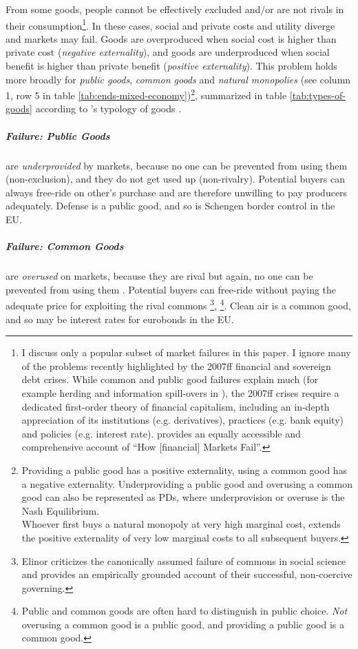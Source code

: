 From some goods, people cannot be effectively excluded and/or are not rivals in their consumption\footnote{
	I discuss only a popular subset of market failures in this paper. I ignore many of the problems recently highlighted by the 2007ff financial and sovereign debt crises. While common and public good failures explain much (for example herding and information spill-overs in \citealt{Banerjee-1992-aa}), the 2007ff crises require a dedicated first-order theory of financial capitalism, including an in-depth appreciation of its institutions (e.g. derivatives), practices (e.g. bank equity) and policies (e.g. interest rate). \cite{Cassidy2010} provides an equally accessible and comprehensive account of ``How [financial] Markets Fail''.}. %
In these cases, social and private costs and utility diverge and markets may fail. Goods are overproduced when social cost is higher than private cost (\emph{negative externality}), and goods are underproduced when social benefit is higher than private benefit (\emph{positive externality}). This problem holds more broadly for \emph{public goods}, \emph{common goods} and \emph{natural monopolies} (see column 1, row 5 in table \ref{tab:ends-mixed-economy})\footnote{
	Providing a public good has a positive externality, using a common good has a negative externality. Underproviding a public good and overusing a common good can also be represented as \glspl{PD}, where underprovision or overuse is the Nash Equilibrium. \\ Whoever first buys a natural monopoly at very high marginal cost, extends the positive externality of very low marginal costs to all subsequent buyers.}, 
summarized in table \ref{tab:types-of-goods} according to \citeauthor{Samuelson-1954-eu}'s typology of goods \citeyearpar{Samuelson-1954-eu}. 



\subparagraph{Failure: Public Goods}  \label{sec:public-good} are \emph{underprovided} by markets, because no one can be prevented from using them (non-exclusion), and they do not get used up (non-rivalry). Potential buyers can always free-ride on other's purchase and are therefore unwilling to pay producers adequately. Defense is a public good, and so is Schengen border control in the \gls{EU}. 

\subparagraph{Failure: Common Goods}  \label{sec:common-good} are \emph{overused} on markets, because they are rival but again, no one can be prevented from using them \citep{Hardin-1968-aa}. Potential buyers can free-ride without paying the adequate price for exploiting the rival commons \citep{Hardin-1968-aa}
\footnote{
	Elinor \cite{Ostrom1990} criticizes the canonically assumed failure of commons in social science and provides an empirically grounded account of their successful, non-coercive governing.
}, 
\footnote{
	Public and common goods are often hard to distinguish in public choice.
	\emph{Not} overusing a common good is a public good, and providing a public good is a common good.
}.
Clean air is a common good, and so may be interest rates for eurobonds in the \gls{EU}. 

